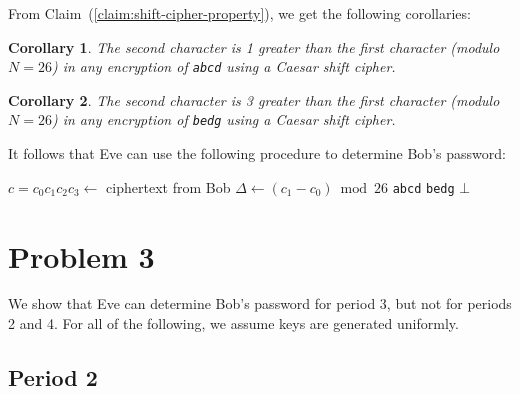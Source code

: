 \documentclass[12pt]{article}
\numberwithin{equation}{section}
\theoremstyle{plain}
\newtheorem{corollary}{Corollary}
\begin{document}
From Claim~(\ref{claim:shift-cipher-property}), we get the following corollaries:
\begin{corollary}
The second character is 1 greater than the first character (modulo $N = 26$)
in any encryption of \texttt{abcd} using a Caesar shift cipher.
\end{corollary}
\begin{corollary}
The second character is 3 greater than the first character (modulo $N = 26$)
in any encryption of \texttt{bedg} using a Caesar shift cipher.
\end{corollary}
It follows that Eve can use the following procedure to determine Bob's password:
\begin{algorithm}[H]
\begin{algorithmic}
    \State $c = c_0c_1c_2c_3 \gets$ ciphertext from Bob
    \State $\Delta \gets (c_1 - c_0) \bmod 26$
        \State \Return \texttt{abcd}
        \State \Return \texttt{bedg}
    \Else
        \State \Return $\bot$
    \EndIf
\EndProcedure
\end{algorithmic}
\end{algorithm}


\section*{Problem 3}

We show that Eve can determine Bob's password for period 3,
but not for periods 2 and 4.
For all of the following, we assume keys are generated uniformly.

\subsection*{Period 2}
\end{document}
